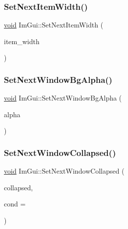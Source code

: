 \mbox{\label{namespaceImGui_a1291228607bee5a703df6553f27cbbb9}} 
\subsubsection{\texorpdfstring{Set\+Next\+Item\+Width()}{SetNextItemWidth()}}
{\footnotesize\ttfamily \hyperlink{imgui__impl__opengl3__loader_8h_ac668e7cffd9e2e9cfee428b9b2f34fa7}{void} Im\+Gui\+::\+Set\+Next\+Item\+Width (\begin{DoxyParamCaption}\item[{float}]{item\+\_\+width }\end{DoxyParamCaption})}

\mbox{\label{namespaceImGui_a7de5a63cec4babe417f972403db6430c}} 
\subsubsection{\texorpdfstring{Set\+Next\+Window\+Bg\+Alpha()}{SetNextWindowBgAlpha()}}
{\footnotesize\ttfamily \hyperlink{imgui__impl__opengl3__loader_8h_ac668e7cffd9e2e9cfee428b9b2f34fa7}{void} Im\+Gui\+::\+Set\+Next\+Window\+Bg\+Alpha (\begin{DoxyParamCaption}\item[{float}]{alpha }\end{DoxyParamCaption})}

\mbox{\label{namespaceImGui_a3e9380e253a3c49665a404e56950a52a}} 
\subsubsection{\texorpdfstring{Set\+Next\+Window\+Collapsed()}{SetNextWindowCollapsed()}}
{\footnotesize\ttfamily \hyperlink{imgui__impl__opengl3__loader_8h_ac668e7cffd9e2e9cfee428b9b2f34fa7}{void} Im\+Gui\+::\+Set\+Next\+Window\+Collapsed (\begin{DoxyParamCaption}\item[{bool}]{collapsed,  }\item[{Im\+Gui\+Cond}]{cond = {} }\end{DoxyParamCaption})}

